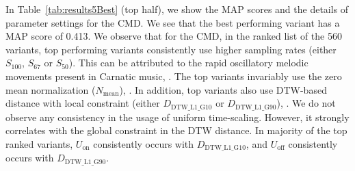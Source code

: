 In Table~\ref{tab:results5Best} (top half), we show the MAP scores and the details of parameter settings for the CMD. We see that the best performing variant has a MAP score of 0.413. We observe that for the CMD, in the ranked list of the 560 variants, top performing variants consistently use higher sampling rates (either  $S_{100}$, $S_{67}$ or $S_{50}$). This can be attributed to the rapid oscillatory melodic movements present in Carnatic music, . The top variants invariably use the zero mean normalization ($N_{\mathrm{mean}}$), . In addition, top variants also use DTW-based distance with local constraint (either $D_{\mathrm{DTW\_L1\_G10}}$ or $D_{\mathrm{DTW\_L1\_G90}}$), . We do not observe any consistency in the usage of uniform time-scaling. However, it strongly correlates with the global constraint in the DTW distance. In majority of the top ranked variants, $U_{\mathrm{on}}$ consistently occurs with $D_{\mathrm{DTW\_L1\_G10}}$, and $U_{\mathrm{off}}$ consistently occurs with $D_{\mathrm{DTW\_L1\_G90}}$. 


%




